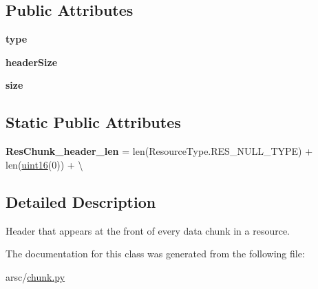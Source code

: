 \subsection*{Public Attributes}
\begin{DoxyCompactItemize}
\item 
\mbox{\label{classarsc_1_1chunk_1_1ResChunk__header_a0521ef18ea2ec7881730f849a97a5e82}} 
{\bfseries type}
\item 
\mbox{\label{classarsc_1_1chunk_1_1ResChunk__header_ae735969556a68c5cc1d397a20794b528}} 
{\bfseries header\+Size}
\item 
\mbox{\label{classarsc_1_1chunk_1_1ResChunk__header_acf998f9b9197f0596f90778335ab8c68}} 
{\bfseries size}
\end{DoxyCompactItemize}
\subsection*{Static Public Attributes}
\begin{DoxyCompactItemize}
\item 
\mbox{\label{classarsc_1_1chunk_1_1ResChunk__header_a20130351bf48d2789d4abc2939c8052f}} 
{\bfseries Res\+Chunk\+\_\+header\+\_\+len} = len(Resource\+Type.\+R\+E\+S\+\_\+\+N\+U\+L\+L\+\_\+\+T\+Y\+PE) + len(\mbox{\hyperlink{classarsc_1_1type_1_1uint16_1_1uint16}{uint16}}(0)) + \textbackslash{}
\end{DoxyCompactItemize}


\subsection{Detailed Description}
Header that appears at the front of every data chunk in a resource. 



The documentation for this class was generated from the following file\+:\begin{DoxyCompactItemize}
\item 
arsc/\mbox{\hyperlink{chunk_8py}{chunk.\+py}}\end{DoxyCompactItemize}
